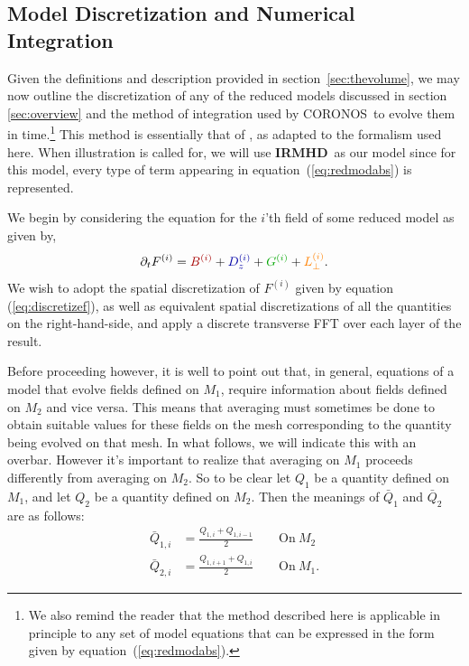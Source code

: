 \documentclass[12pt, letterpaper, oneside, leqno, openright]{memoir}
\newcommand{\irmhd}{\textbf{IRMHD}}
\newcommand{\coronos}{\textsf{CORONOS}}
\begin{document}
\subsection{Model Discretization and Numerical Integration}
\label{sec:themethod}
%
Given the definitions and description provided in
section~\ref{sec:thevolume}, we may now outline the
discretization of any of the reduced models discussed in
section \ref{sec:overview} and the method of integration
used by \coronos\ to evolve them in time.\footnote{We also
remind the reader that the method described here is 
applicable in principle to any set of model equations that
can be expressed in the form given by 
equation~(\ref{eq:redmodabs}).} This method is essentially
that of \citep{Longcope93}, as adapted to the formalism
used here. When illustration is called for, we will use 
\irmhd\ as our model since for this model, every type of
term appearing in equation~(\ref{eq:redmodabs})
is represented.
%
\par
%
We begin by considering the equation for the $i$'th field
of some reduced model as given by,
%
\begin{equation}
  \pardt F^{(i)} = { \color{red!65!black}  B^{(i)}       }
                 + { \color{blue!65!black} D^{(i)}_z     }
                 + { \color{green!65!black}G^{(i)}       }
                 + { \color{orange}        L^{(i)}_\perp }.
\end{equation}
%
We wish to adopt the spatial discretization of $F^{(i)}$ given by
equation (\ref{eq:discretizef}), as well as equivalent spatial
discretizations of all the quantities on the right-hand-side,
and apply a discrete transverse FFT over each layer of the result.
%
\par
%
Before proceeding however, it is well to point out that, in general,
equations of a model that evolve fields defined on $M_1$, require
information about fields defined on $M_2$ and vice versa. This
means that averaging must sometimes be done to obtain suitable
values for these fields on the mesh corresponding to the quantity
being evolved on that mesh. In what follows, we will indicate this
with an overbar. However it's important to realize that averaging
on $M_1$ proceeds differently from averaging on $M_2$. So to be
clear let $Q_1$ be a quantity defined on $M_1$, and let $Q_2$ be
a quantity defined on $M_2$. Then the meanings of $\bar Q_1$
and $\bar Q_2$ are as follows:
%
\begin{align}
  \bar Q_{1,i} &= \frac{Q_{1,i  } + Q_{1,i-1}}{2}\qquad \mathrm{On\ } M_2 \\
  \bar Q_{2,i} &= \frac{Q_{1,i+1} + Q_{1,i  }}{2}\qquad \mathrm{On\ } M_1.
\end{align}
\end{document}
